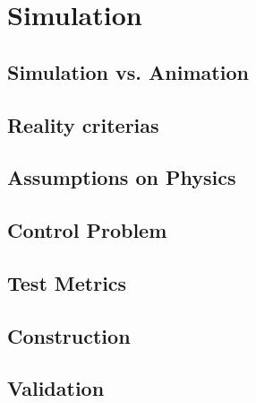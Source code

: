 
\chapter{Simulation}
\label{chap:simulation}

\section{Simulation vs. Animation}
\label{sec:simulation_animation}

\section{Reality criterias}
\label{sec:reality}

\section{Assumptions on Physics}
\label{sec:physics}

\section{Control Problem}
\label{sec:control_problem}

\section{Test Metrics}
\label{sec:test_metrics}

\section{Construction}
\label{sec:construction}

\section{Validation}
\label{sec:validation}

